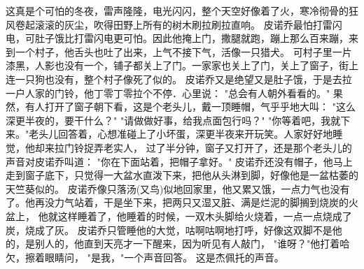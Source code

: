 \documentclass[12pt,UTF8]{ctexbook}
\begin{document}
这真是个可怕的冬夜，雷声隆隆，电光闪闪，整个天空好像着了火，寒冷彻骨的狂风卷起滚滚的灰尘，吹得田野上所有的树木刷拉刷拉直响。
皮诺乔最怕打雷闪电，可肚子饿比打雷闪电更可怕。因此他掩上门，撒腿就跑，蹦上那么百来蹦，来到一个村子，他舌头也吐了出来，上气不接下气，活像一只猎犬。
可村子里一片漆黑，人影也没有一个，铺子都关上了门。一家家也关上了门，关上了窗子，街上连一只狗也没有，整个村子像死了似的。
皮诺乔又是绝望又是肚子饿，于是去拉一户人家的门铃，他丁零丁零拉个不停．心里说：
"总会有人朝外看看的。"
果然，有人打开了窗子朝下看，这是个老头儿，戴一顶睡帽，气乎乎地大叫：
"这么深更半夜的，要干什么？"
"请做做好事，给我点面包行吗？"
"你等着吧，我就下来。"老头儿回答着，心想准碰上了小坏蛋，深更半夜来开玩笑。人家好好地睡觉，他却来拉门铃捉弄老实人，
过了半分钟，窗子又打开了，还是那个老头儿的声音对皮诺乔叫道：
"你在下面站着，把帽子拿好。"
皮诺乔还没有帽子，他马上走到窗子底下，只觉得一大盆水直泼下来，把他从头淋到脚，好像他是一盆枯萎的天竺葵似的。
皮诺乔像只落汤(又鸟)似地回家里，他又累又饿，一点力气也没有了。他再没力气站着，干是坐下来，把两只又湿又脏、满是烂泥的脚搁到烧炭的火盆上，
他就这样睡着了，他睡着的时候，一双木头脚给火烧着，一点一点烧成了炭，烧成了灰。
皮诺乔只管睡他的大觉，咕啊咕啊地打呼，好像这双脚不是他的，是别人的，他直到天亮才一下醒来，因为听见有人敲门，
"谁呀？"他打着哈欠，擦着眼睛问，
"是我，"一个声音回答。
这是杰佩托的声音。

\chapter{}
\end{document}
